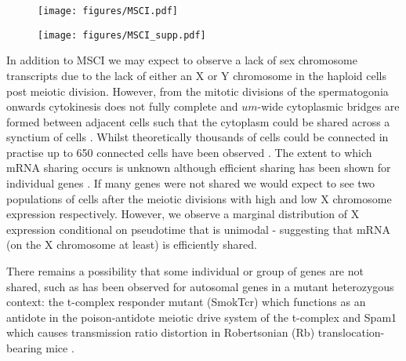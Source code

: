 \begin{figure}[H]
	\centering
	\texttt{[image: figures/MSCI.pdf]}
	\caption{}
	\label{fig:MSCI}
\end{figure}

\begin{figure}[H]
	\centering
	\texttt{[image: figures/MSCI\_supp.pdf]}
	\caption{}
	\label{fig:MSCI}
\end{figure}


In addition to MSCI we may expect to observe a lack of sex chromosome transcripts due to the lack of either an X or Y chromosome in the haploid cells post meiotic division. However, from the mitotic divisions of the spermatogonia onwards cytokinesis does not fully complete and $um$-wide cytoplasmic bridges are formed between adjacent cells such that the cytoplasm could be shared across a synctium of cells \cite{Greenbaum2011Germ}. Whilst theoretically thousands of cells could be connected in practise up to 650 connected cells have been observed \cite{Ren1991Clonal}. The extent to which mRNA sharing occurs is unknown although efficient sharing has been shown for individual genes \cite{Braun1989Genetically}. If many genes were not shared we would expect to see two populations of cells after the meiotic divisions with high and low X chromosome expression respectively. However, we observe a marginal distribution of X expression conditional on pseudotime that is unimodal - suggesting that mRNA (on the X chromosome at least) is efficiently shared.

There remains a possibility that some individual or group of genes are not shared, such as has been observed for autosomal genes in a mutant heterozygous context: the t-complex responder mutant (SmokTcr) which functions as an antidote in the poison-antidote meiotic drive system of the t-complex \cite{Veron2009Retention} and Spam1 which causes transmission ratio distortion in Robertsonian (Rb) translocation-bearing mice \cite{Martin-DeLeon2005Spam1associated}.

